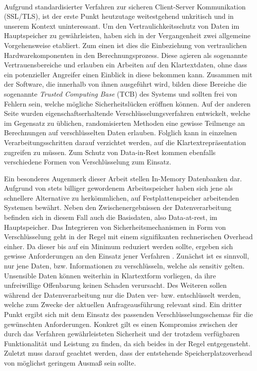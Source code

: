 \paragraph{}
Aufgrund standardisierter Verfahren zur sicheren Client-Server Kommunikation (SSL/TLS), ist der erste Punkt heutzutage weitestgehend unkritisch und in unserem Kontext uninteressant. Um den Vertraulichkeitsschutz von Daten im Hauptspeicher zu gewährleisten, haben sich in der Vergangenheit zwei allgemeine Vorgehensweise etabliert. Zum einen ist dies die Einbeziehung von vertraulichen Hardwarekomponenten in den Berechnungsprozess. Diese agieren als sogenannte Vertrauensbereiche und erlauben ein Arbeiten auf den Klartextdaten, ohne dass ein potenzieller Angreifer einen Einblick in diese bekommen kann. Zusammen mit der Software, die innerhalb von ihnen ausgeführt wird, bilden diese Bereiche die sogenannte \textit{Trusted Computing Base} (TCB) des Systems und sollten frei von Fehlern sein, welche mögliche Sicherheitslücken eröffnen können. Auf der anderen Seite wurden eigenschaftserhaltende Verschlüsselungsverfahren entwickelt, welche im Gegensatz zu üblichen, randomisierten Methoden eine gewisse Teilmenge an Berechnungen auf verschlüsselten Daten erlauben. Folglich kann in einzelnen Verarbeitungsschritten darauf verzichtet werden, auf die Klartextrepräsentation zugreifen zu müssen. Zum Schutz von Data-in-Rest kommen ebenfalls verschiedene Formen von Verschlüsselung zum Einsatz.

Ein besonderes Augenmerk dieser Arbeit stellen In-Memory Datenbanken dar. Aufgrund von stets billiger gewordenem Arbeitsspeicher haben sich jene als schnellere Alternative zu herkömmlichen, auf Festplattenspeicher arbeitenden Systemen bewährt. Neben den Zwischenergebnissen der Datenverarbeitung befinden sich in diesem Fall auch die Basisdaten, also Data-at-rest, im Hauptspeicher.
Das Integrieren von Sicherheitsmechanismen in Form von Verschlüsselung geht in der Regel mit einem signifikanten rechnerischen Overhead einher. Da dieser bis auf ein Minimum reduziert werden sollte, ergeben sich gewisse Anforderungen an den Einsatz jener Verfahren \cite{Shmueli2010}. Zunächst ist es sinnvoll, nur jene Daten, bzw. Informationen zu verschlüsseln, welche als sensitiv gelten. Unsensible Daten können weiterhin in Klartextform vorliegen, da ihre unfreiwillige Offenbarung keinen Schaden verursacht. Des Weiteren sollen während  der Datenverarbeitung nur die Daten ver- bzw. entschlüsselt werden, welche zum Zwecke der aktuellen Anfrageausführung relevant sind. Ein dritter Punkt ergibt sich mit dem Einsatz des passenden Verschlüsselungsschemas für die gewünschten Anforderungen. Konkret gilt es einen Kompromiss zwischen der durch das Verfahren gewährleisteten Sicherheit und der trotzdem verfügbaren Funktionalität und Leistung zu finden, da sich beides in der Regel entgegensteht. Zuletzt muss darauf geachtet werden, dass der entstehende Speicherplatzoverhead von möglichst geringem Ausmaß sein sollte.

